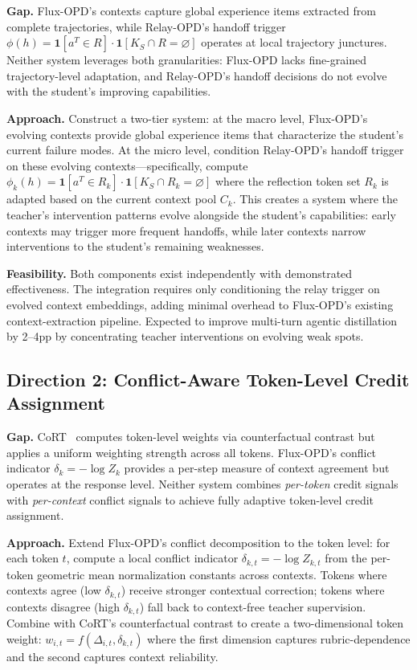 \documentclass[11pt,a4paper]{article}
\begin{document}
\textbf{Gap.} Flux-OPD's contexts capture global experience items extracted from complete trajectories, while Relay-OPD's handoff trigger $\phi(h) = \mathbf{1}[a^T \in R] \cdot \mathbf{1}[K_S \cap R = \varnothing]$ operates at local trajectory junctures. Neither system leverages both granularities: Flux-OPD lacks fine-grained trajectory-level adaptation, and Relay-OPD's handoff decisions do not evolve with the student's improving capabilities.

\textbf{Approach.} Construct a two-tier system: at the macro level, Flux-OPD's evolving contexts provide global experience items that characterize the student's current failure modes. At the micro level, condition Relay-OPD's handoff trigger on these evolving contexts---specifically, compute $\phi_k(h) = \mathbf{1}[a^T \in R_k] \cdot \mathbf{1}[K_S \cap R_k = \varnothing]$ where the reflection token set $R_k$ is adapted based on the current context pool $C_k$. This creates a system where the teacher's intervention patterns evolve alongside the student's capabilities: early contexts may trigger more frequent handoffs, while later contexts narrow interventions to the student's remaining weaknesses.

\textbf{Feasibility.} Both components exist independently with demonstrated effectiveness. The integration requires only conditioning the relay trigger on evolved context embeddings, adding minimal overhead to Flux-OPD's existing context-extraction pipeline. Expected to improve multi-turn agentic distillation by 2--4pp by concentrating teacher interventions on evolving weak spots.

\subsection{Direction 2: Conflict-Aware Token-Level Credit Assignment}

\textbf{Gap.} CoRT~\cite{cort2026} computes token-level weights via counterfactual contrast but applies a uniform weighting strength across all tokens. Flux-OPD's conflict indicator $\delta_k = -\log Z_k$ provides a per-step measure of context agreement but operates at the response level. Neither system combines \emph{per-token} credit signals with \emph{per-context} conflict signals to achieve fully adaptive token-level credit assignment.

\textbf{Approach.} Extend Flux-OPD's conflict decomposition to the token level: for each token $t$, compute a local conflict indicator $\delta_{k,t} = -\log Z_{k,t}$ from the per-token geometric mean normalization constants across contexts. Tokens where contexts agree (low $\delta_{k,t}$) receive stronger contextual correction; tokens where contexts disagree (high $\delta_{k,t}$) fall back to context-free teacher supervision. Combine with CoRT's counterfactual contrast to create a two-dimensional token weight: $w_{i,t} = f(\Delta_{i,t}, \delta_{k,t})$ where the first dimension captures rubric-dependence and the second captures context reliability.
\end{document}
